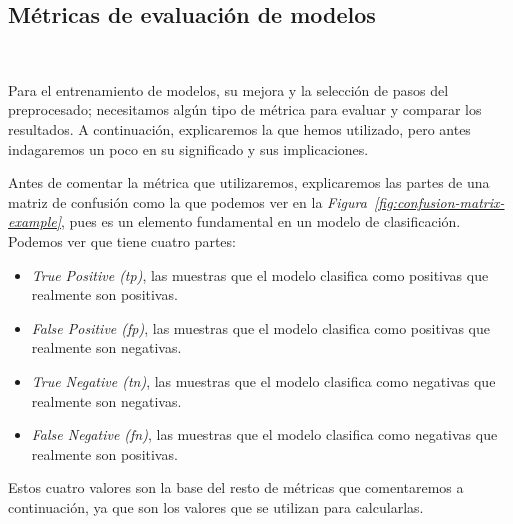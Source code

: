 \subsection{Métricas de evaluación de modelos}\ \label{sec:metrics}

Para el entrenamiento de modelos, su mejora y la selección de pasos del preprocesado; necesitamos algún tipo de métrica para evaluar y comparar los resultados. A continuación, explicaremos la que hemos utilizado, pero antes indagaremos un poco en su significado y sus implicaciones.

Antes de comentar la métrica que utilizaremos, explicaremos las partes de una matriz de confusión como la que podemos ver en la \textit{Figura\ \ref{fig:confusion-matrix-example}}, pues es un elemento fundamental en un modelo de clasificación. Podemos ver que tiene cuatro partes:

\begin{itemize}
    \item \textit{True Positive (tp)}, las muestras que el modelo clasifica como positivas que realmente son positivas.
    \item \textit{False Positive (fp)}, las muestras que el modelo clasifica como positivas que realmente son negativas.
    \item \textit{True Negative (tn)}, las muestras que el modelo clasifica como negativas que realmente son negativas.
    \item \textit{False Negative (fn)}, las muestras que el modelo clasifica como negativas que realmente son positivas.
\end{itemize}

Estos cuatro valores son la base del resto de métricas que comentaremos a continuación, ya que son los valores que se utilizan para calcularlas. \cite{Precisio23:online}

